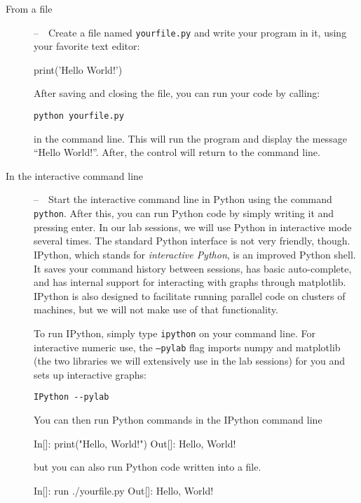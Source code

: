 \begin{description}
\item[From a file]--~~Create a file named \texttt{yourfile.py} and write your program in it, using your favorite text editor:

\begin{python}
print('Hello World!')
\end{python}

After saving and closing the file, you can run your code by calling: 

\begin{verbatim}
python yourfile.py
\end{verbatim}

in the command line. This will run the program and display the message ``Hello World!''. After, the control will return to the command line.




\item[In the interactive command line]--~~Start the interactive command line in
Python using the command \texttt{python}. After this, you can run Python code
by simply writing it and pressing enter. In our lab sessions, we will use
Python in interactive mode several times. The standard Python interface is not
very friendly, though. IPython, which stands for \emph{interactive Python}, is
an improved Python shell. It saves your command history between sessions, has
basic auto-complete, and has internal support for interacting with graphs
through matplotlib. IPython is also designed to facilitate running parallel
code on clusters of machines, but we will not make use of that functionality.

To run IPython, simply type \texttt{ipython} on your command
line\footnotemark{}. For interactive numeric use, the
\texttt{--pylab} flag imports numpy and matplotlib (the two libraries we will
extensively use in the lab sessions) for you and sets up interactive graphs:

\begin{verbatim}
IPython --pylab
\end{verbatim}

You can then run Python commands in the IPython command line

\begin{python}
 In[]: print("Hello, World!")
Out[]: Hello, World!
\end{python}

but you can also run Python code written into a file.

\begin{python}
 In[]: run ./yourfile.py
Out[]: Hello, World!
\end{python}
\end{description}


